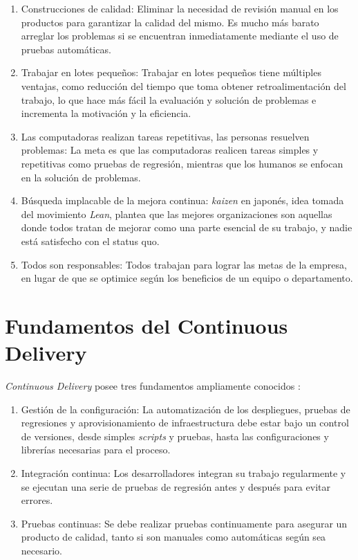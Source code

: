 \begin{enumerate}
    \item Construcciones de calidad: Eliminar la necesidad de revisión manual en los productos para garantizar la calidad del mismo. Es mucho más barato arreglar los problemas si se encuentran inmediatamente mediante el uso de pruebas automáticas.

    \item Trabajar en lotes pequeños: Trabajar en lotes pequeños tiene múltiples ventajas, como reducción del tiempo que toma obtener retroalimentación del trabajo, lo que hace más fácil la evaluación y solución de problemas e incrementa la motivación y la eficiencia.

    \item Las computadoras realizan tareas repetitivas, las personas resuelven problemas: La meta es que las computadoras realicen tareas simples y repetitivas como pruebas de regresión, mientras que los humanos se enfocan en la solución de problemas.

    \item Búsqueda implacable de la mejora continua: \textit{kaizen} en japonés, idea tomada del movimiento \textit{Lean}, plantea que las mejores organizaciones son aquellas donde todos tratan de mejorar como una parte esencial de su trabajo, y nadie está satisfecho con el status quo.

    \item Todos son responsables: Todos trabajan para lograr las metas de la empresa, en lugar de que se optimice según los beneficios de un equipo o departamento.

\end{enumerate}

\section{Fundamentos del Continuous Delivery}

\textit{Continuous Delivery} posee tres fundamentos ampliamente conocidos \cite{cdfoundations}:

\begin{enumerate}

    \item Gestión de la configuración: La automatización de los despliegues, pruebas de regresiones y aprovisionamiento de infraestructura debe estar bajo un control de versiones, desde simples \textit{scripts} y pruebas, hasta las configuraciones y librerías necesarias para el proceso.

    \item Integración continua: Los desarrolladores integran su trabajo regularmente y se ejecutan una serie de pruebas de regresión antes y después para evitar errores.

    \item Pruebas continuas: Se debe realizar pruebas continuamente para asegurar un producto de calidad, tanto si son manuales como automáticas según sea necesario.

\end{enumerate}

